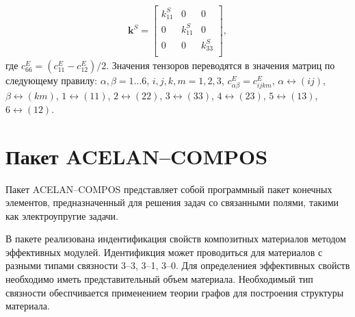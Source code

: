 

\[
\begin{aligned}
\boldsymbol{k}^S=
\begin{bmatrix}
	k^S_{11} & 0 & 0 \\
	0 & k^S_{11} & 0 \\
	0 & 0 & k^S_{33} \\
\end{bmatrix}, 
\end{aligned} 
\]
где $c_{66}^E=(c_{11}^E-c_{12}^E)/2$.
Значения тензоров переводятся в значения матриц по следующему правилу: $\alpha, \beta =1 \dots 6$, $i,j,k,m = 1,2,3$, $c^E_{\alpha \beta}=c^E_{ijkm}$, $\alpha \leftrightarrow (ij)$, $\beta \leftrightarrow (km)$, 
$1 \leftrightarrow (11)$, 
$2 \leftrightarrow (22)$, 
$3 \leftrightarrow (33)$, 
$4 \leftrightarrow (23)$,
$5 \leftrightarrow (13)$,
$6 \leftrightarrow (12)$.



\section{Пакет ACELAN--COMPOS}\label{sec:ch1/sec3}

Пакет ACELAN--COMPOS представляет собой программный пакет конечных элементов, предназначенный для решения задач со связанными полями, такими как электроупругие задачи.


В пакете реализована индентификация свойств композитных материалов методом эффективных модулей. Идентификция может проводиться для материалов с разными типами связности 3--3, 3--1, 3--0.
Для определениея эффективных свойств необходимо иметь представительный объем материала. 
Необходимый тип связности обеспчивается применением теории графов для построения структуры материала.



